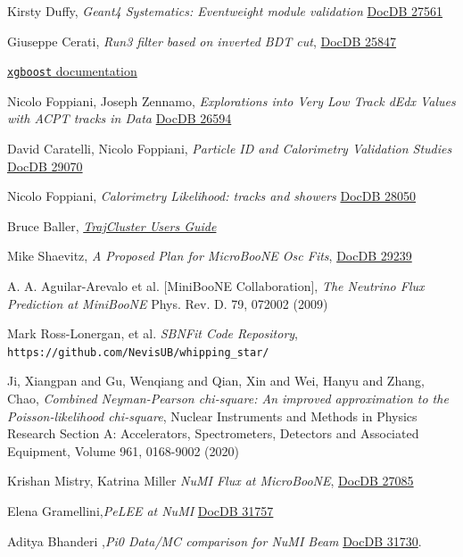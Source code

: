 \documentclass[a4paper]{article}
\begin{document}
\begin{thebibliography}{}
Kirsty Duffy, \emph{Geant4 Systematics: Eventweight module validation}
\href{https://microboone-docdb.fnal.gov/cgi-bin/private/ShowDocument?docid=27561}{DocDB 27561}

Giuseppe Cerati, \emph{Run3 filter based on inverted BDT cut}, \href{https://microboone-docdb.fnal.gov/cgi-bin/private/ShowDocument?docid=25847}{DocDB 25847}

\href{https://xgboost.readthedocs.io/}{\texttt{xgboost} documentation}

Nicolo Foppiani, Joseph Zennamo, \emph{Explorations into Very Low Track dEdx Values with ACPT tracks in Data}
\href{https://microboone-docdb.fnal.gov/cgi-bin/private/ShowDocument?docid=26594}{DocDB 26594}

David Caratelli, Nicolo Foppiani, \emph{Particle ID and Calorimetry Validation Studies}
\href{https://microboone-docdb.fnal.gov/cgi-bin/private/ShowDocument?docid=29070}{DocDB 29070}

Nicolo Foppiani, \emph{Calorimetry Likelihood: tracks and showers}
\href{https://microboone-docdb.fnal.gov/cgi-bin/private/ShowDocument?docid=28050}{DocDB 28050}

Bruce Baller,
\href{https://cdcvs.fnal.gov/redmine/attachments/download/49184/TrajCluster\%20Users\%20Guide.pdf}{\emph{TrajCluster Users Guide}}

Mike Shaevitz, \emph{A Proposed Plan for MicroBooNE Osc Fits}, \href{https://microboone-docdb.fnal.gov/cgi-bin/private/ShowDocument?docid=29239}{DocDB 29239}

A. A. Aguilar-Arevalo et al. [MiniBooNE Collaboration], \emph{The Neutrino Flux Prediction at MiniBooNE} Phys. Rev. D. 79, 072002 (2009)

Mark Ross-Lonergan, et al. \emph{SBNFit Code Repository}, \texttt{https://github.com/NevisUB/whipping\_star/}

Ji, Xiangpan and Gu, Wenqiang and Qian, Xin and Wei, Hanyu and Zhang, Chao, \emph{Combined Neyman-Pearson chi-square: An improved approximation to the Poisson-likelihood chi-square}, Nuclear Instruments and Methods in Physics Research Section A: Accelerators, Spectrometers, Detectors and Associated Equipment, Volume 961, 0168-9002 (2020)

Krishan Mistry, Katrina Miller \emph{NuMI Flux at MicroBooNE}, \href{https://microboone-docdb.fnal.gov/cgi-bin/private/ShowDocument?docid=27085}{DocDB 27085}

 Elena Gramellini,\emph{PeLEE at NuMI} \href{https://microboone-docdb.fnal.gov/cgi-bin/private/ShowDocument?docid=31757}{DocDB 31757}

 Aditya Bhanderi ,\emph{Pi0 Data/MC comparison for NuMI Beam} \href{https://microboone-docdb.fnal.gov/cgi-bin/private/RetrieveFile?docid=31730&filename=23July2020.pdf&version=1}{DocDB 31730}.

\end{thebibliography}
\end{document}
